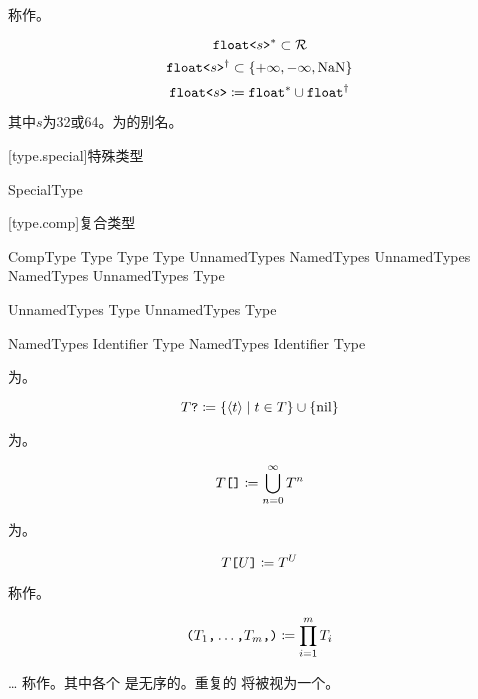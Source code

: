 \pnum
{}称作。

$$ \texttt{float<}s\texttt{>}^\ast \subset \mathcal{R} $$
$$ \texttt{float<}s\texttt{>}^\dagger \subset \{ +\infty, -\infty, \mathrm{NaN} \} $$
$$ \texttt{float<}s\texttt{>} \coloneqq \texttt{float}^\ast \cup \texttt{float}^\dagger $$

其中$s$为32或64。为的别名。

[type.special]{特殊类型}

\begin{bnf}{SpecialType}
     \br
\end{bnf}

[type.comp]{复合类型}

\begin{bnf}{CompType}
    Type  \br
    Type \terminal{[} Type \terminal{]}
    \terminal{(} UnnamedTypes \terminal{)} \br
    \terminal{(} NamedTypes \terminal{)} \br
    \terminal{(} UnnamedTypes \terminal{,} NamedTypes \terminal{)} \br
    \terminal{\{} UnnamedTypes \terminal{\}}
    Type \terminal{*}
\end{bnf}

\begin{bnf}{UnnamedTypes}
    Type \br
    UnnamedTypes \terminal{,} Type
\end{bnf}

\begin{bnf}{NamedTypes}
    Identifier \terminal{:} Type \br
    NamedTypes \terminal{,} Identifier \terminal{:} Type
\end{bnf}

\pnum
{}为。

$$ T\texttt{?} \coloneqq \{ \langle t \rangle \mid t \in T \} \cup \{ \mathrm{nil} \} $$

\pnum
{}为。

$$ T\texttt{[]} \coloneqq \bigcup^\infty_{n=0} T^n $$

\pnum
{}为。

$$ T\texttt{[}U\texttt{]} \coloneqq T^U $$

\pnum
{} 称作。

$$ \texttt{(}T_1\texttt{,} \ldots\texttt{,} T_m\texttt{,}\texttt{)} \coloneqq \prod^m_{i=1} T_i$$

\pnum
{}\ldots{} 称作。其中各个  是无序的。重复的  将被视为一个。

